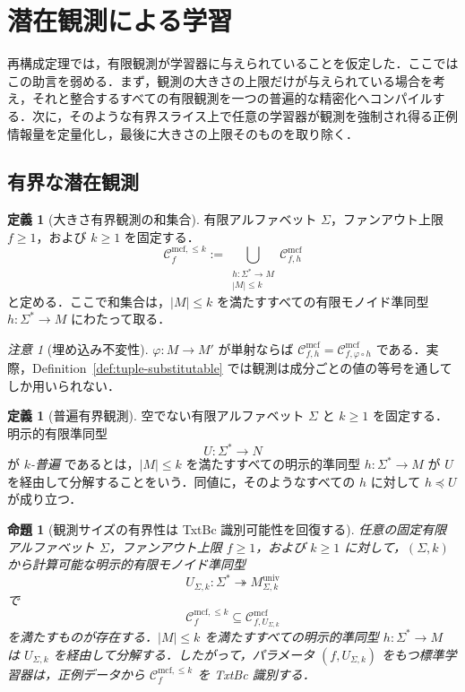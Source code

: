 \documentclass[11pt,a4paper]{ltjsarticle}
\numberwithin{equation}{section}
\theoremstyle{plain}
\newtheorem{proposition}[theorem]{命題}
\theoremstyle{definition}
\newtheorem{definition}[theorem]{定義}
\theoremstyle{remark}
\newtheorem{remark}[theorem]{注意}
\newcommand{\Cmcf}[2]{\mathcal{C}^{\mathrm{mcf}}_{#1,#2}}
\newcommand{\Clatent}[2]{\mathcal{C}^{\mathrm{mcf},\le #2}_{#1}}
\begin{document}
\section{潜在観測による学習}
\label{sec:fixed-observation}

再構成定理では，有限観測が学習器に与えられていることを仮定した．ここではこの助言を弱める．まず，観測の大きさの上限だけが与えられている場合を考え，それと整合するすべての有限観測を一つの普遍的な精密化へコンパイルする．次に，そのような有界スライス上で任意の学習器が観測を強制され得る正例情報量を定量化し，最後に大きさの上限そのものを取り除く．

\subsection{有界な潜在観測}
\begin{definition}[大きさ有界観測の和集合]
\label{def:bounded-observation-union}
有限アルファベット \(\Sigma\)，ファンアウト上限 \(f\ge1\)，および \(k\ge1\) を固定する．
\[
  \Clatent{f}{k}:=\bigcup_{\substack{h:\Sigma^*\to M\\ |M|\le k}} \Cmcf{f}{h}
\]
と定める．ここで和集合は，\(|M|\le k\) を満たすすべての有限モノイド準同型
\(h:\Sigma^*\to M\) にわたって取る．
\end{definition}

\begin{remark}[埋め込み不変性]
\(\varphi:M\to M'\) が単射ならば
\(\Cmcf{f}{h}=\Cmcf{f}{\varphi\circ h}\) である．実際，Definition~\ref{def:tuple-substitutable} では観測は成分ごとの値の等号を通してしか用いられない．
\end{remark}

\begin{definition}[普遍有界観測]
\label{def:universal-bounded-observation}
空でない有限アルファベット \(\Sigma\) と \(k\ge1\) を固定する．明示的有限準同型
\[
  U:\Sigma^*\to N
\]
が \emph{\(k\)-普遍} であるとは，\(|M|\le k\) を満たすすべての明示的準同型
\(h:\Sigma^*\to M\) が \(U\) を経由して分解することをいう．同値に，そのようなすべての \(h\) に対して \(h\preceq U\) が成り立つ．
\end{definition}

\begin{proposition}[観測サイズの有界性は TxtBc 識別可能性を回復する]
\label{prop:bounded-union-identifiable}
任意の固定有限アルファベット \(\Sigma\)，ファンアウト上限 \(f\ge1\)，および \(k\ge1\) に対して，\((\Sigma,k)\) から計算可能な明示的有限モノイド準同型
\[
  U_{\Sigma,k}:\Sigma^*\twoheadrightarrow M_{\Sigma,k}^{\mathrm{univ}}
\]
で
\[
  \Clatent{f}{k}\subseteq\Cmcf{f}{U_{\Sigma,k}}
\]
を満たすものが存在する．\(|M|\le k\) を満たすすべての明示的準同型 \(h:\Sigma^*\to M\) は \(U_{\Sigma,k}\) を経由して分解する．したがって，パラメータ \((f,U_{\Sigma,k})\) をもつ標準学習器は，正例データから \(\Clatent{f}{k}\) を TxtBc 識別する．
\end{proposition}
\end{document}
